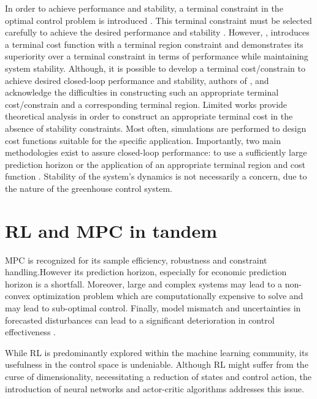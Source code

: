  In order to achieve performance and stability, a terminal constraint in the optimal control problem is introduced \cite{amritEconomicOptimizationUsing2011}. This terminal constraint must be selected carefully to achieve the desired performance and stability \cite{rawlingsFundamentalsEconomicModel2012}. However, \cite{amritEconomicOptimizationUsing2011}, introduces a terminal cost function with a terminal region constraint and demonstrates its superiority over a terminal constraint in terms of performance while maintaining system stability. Although, it is possible to develop a terminal cost/constrain to achieve desired closed-loop performance and stability, authors of \cite{rawlingsFundamentalsEconomicModel2012}, \cite{amritEconomicOptimizationUsing2011} and \cite{ellisTutorialReviewEconomic2014} acknowledge the difficulties in constructing such an appropriate terminal cost/constrain and a corresponding terminal region. Limited works provide theoretical analysis in order to construct an appropriate terminal cost in the absence of stability constraints. Most often, simulations are performed to design cost functions suitable for the specific application. Importantly, two main methodologies exist to assure closed-loop performance: to use a sufficiently large prediction horizon or the application of an appropriate terminal region and cost function \cite{ellisTutorialReviewEconomic2014}. Stability of the system's dynamics is not necessarily a concern, due to the nature of the greenhouse control system.

\section{RL and MPC in tandem}
MPC is recognized for its sample efficiency, robustness and constraint handling.However its prediction horizon, especially for economic prediction horizon is a shortfall. Moreover, large and complex systems may lead to a non-convex optimization problem which are computationally expensive to solve and may lead to sub-optimal control. Finally, model mismatch and uncertainties in forecasted disturbances can lead to a significant deterioration in control effectiveness \cite{arroyoReinforcedModelPredictive2022}.

While RL is predominantly explored within the machine learning community, its usefulness in the control space is undeniable. Although RL might suffer from the curse of dimensionality, necessitating a reduction of states and control action, the introduction of neural networks and actor-critic algorithms addresses this issue.

